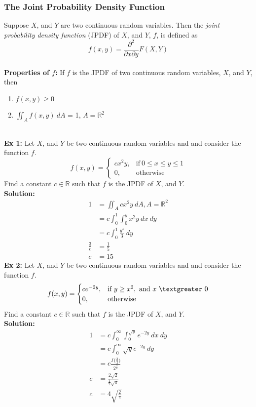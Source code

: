 \documentclass{article}
\newcommand{\ti}[1]{\textit{#1}}
\newcommand{\tb}[1]{\textbf{#1}}
\newcommand{\R}{\mathbb{R}}
\newcommand{\gt}{\textgreater}
\newcommand{\Ga}{\Gamma}
\newcommand{\exxi}{\textbf{Ex 1: }}
\newcommand{\exxii}{\textbf{Ex 2:  }}
\newcommand{\soln}{\textbf{Solution: }}
\begin{document}
\subsubsection{The Joint Probability Density Function}
Suppose $X$, and $Y$ are two continuous random variables. Then the \ti{joint probability density function} (JPDF) of $X$, and $Y$, $f$, is defined as
\[f(x, y) = \frac{\partial^2}{\partial x\partial y}F(X, Y)\]\\
\tb{Properties of $f$:} If $f$ is the JPDF of two continuous random variables, $X$, and $Y$, then
\begin{enumerate}
	\item $f(x, y) \geq 0$
	\item $\iint_{A} f(x, y)\ dA$ = 1, $A=\R^{2}$
\end{enumerate}
\ \\
\exxi Let $X$, and $Y$ be two continuous random variables and and consider the function $f$. 
\[
f(x, y) =
\begin{cases}
	cx^{2}y, &\text{if}\ 0\leq x \leq y \leq 1\\
	0, &\text{otherwise}
\end{cases}
\]
Find a constant $c \in \R$ such that $f$ is the JPDF of $X$, and $Y$.\\
\soln
\begin{align*}
	1 &= \iint_{A} cx^2y\ dA, A = \R^{2}\\
	&= c\int_{0}^{1}\int_{0}^{y}x^2y\ dx\ dy\\
	&= c\int_{0}^{1} \frac{y^{4}}{3}\ dy\\
	\frac{3}{c}&= \frac{1}{5}\\
	c &= 15
\end{align*}
\exxii Let $X$, and $Y$ be two continuous random variables and and consider the function $f$.
\[
f(x, y) =
\begin{cases}
	ce^{-2y}, &\text{if}\ y\geq x^{2},\ \text{and}\ x\ \gt\ 0\\
	0, &\text{otherwise}
\end{cases}
\]
Find a constant $c \in \R$ such that $f$ is the JPDF of $X$, and $Y$.\\
\soln
\begin{align*}
	1 &= c\int_{0}^{\infty}\int_{0}^{\sqrt{y}}e^{-2y}\ dx\ dy\\
	&= c\int_{0}^{\infty} \sqrt{y}e^{-2y}\ dy\\
	&= c\frac{\Ga\big(\frac{3}{2}\big)}{2^{\frac{3}{2}}}\\
	c &= \frac{2\sqrt{2}}{\frac{1}{2}\sqrt{\pi}}\\
	c &= 4\sqrt{\frac{2}{\pi}}
\end{align*}
\newpage
\end{document}
